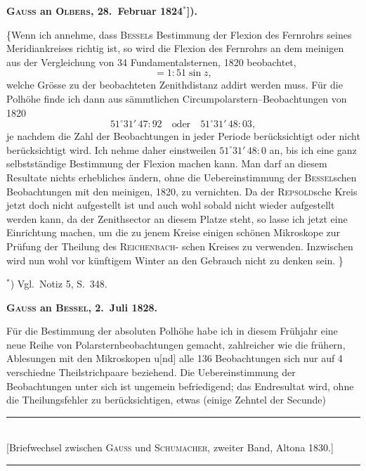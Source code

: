 \documentclass[12pt,a4paper]{article}
\theoremstyle{plain}
\theoremstyle{definition}
\theoremstyle{remark}
\begin{document}
\medskip
\begin{center}
\textbf{\textsc{Gauss} an \textsc{Olbers}, 28.\ Februar 1824$^*$]).}
\end{center}

\medskip
\{\dotfill Wenn ich annehme, dass \textsc{Bessel}s Bestimmung der Flexion des
Fernrohrs seines Meridiankreises richtig ist, so wird die Flexion des Fernrohrs
an dem meinigen aus der Vergleichung von 34 Fundamentalsternen, 1820
beobachtet,
\[= 1\!\!:\!\!51 \sin z,\]
welche Gr\"{o}sse zu der beobachteten Zenithdistanz addirt werden muss. F\"{u}r
die Polh\"{o}he finde ich dann aus s\"{a}mmtlichen Circumpolarstern--Beobachtungen
von 1820
\[51^\circ 31'\,47\!\!:\!\!92 \quad \text{oder} \quad 51^\circ 31'\,48\!\!:\!\!03,\]
je nachdem die Zahl der Beobachtungen in jeder Periode ber\"{u}cksichtigt oder
nicht ber\"{u}cksichtigt wird. Ich nehme daher einstweilen $51^\circ 31'\,48\!\!:\!\!0$ an, bis
ich eine ganz selbstst\"{a}ndige Bestimmung der Flexion machen kann. Man darf
an diesem Resultate nichts erhebliches \"{a}ndern, ohne die Uebereinstimmung
der \textsc{Bessel}schen Beobachtungen mit den meinigen, 1820, zu vernichten. Da
der \textsc{Repsold}sche Kreis jetzt doch nicht aufgestellt ist und auch wohl sobald
nicht wieder aufgestellt werden kann, da der Zenithsector an diesem Platze
steht, so lasse ich jetzt eine Einrichtung machen, um die zu jenem Kreise
einigen sch\"{o}nen Mikroskope zur Pr\"{u}fung der Theilung des \textsc{Reichenbach}-
schen Kreises zu verwenden. Inzwischen wird nun wohl vor k\"{u}nftigem Winter
an den Gebrauch nicht zu denken sein. \dotfill\}

\smallskip
$^*$) Vgl.\ Notiz 5, S.\ 348.

\medskip
\begin{center}
\textbf{\textsc{Gauss} an \textsc{Bessel}, 2.\ Juli 1828.}
\end{center}

\medskip
F\"{u}r die Bestimmung der absoluten Polh\"{o}he habe ich in diesem Fr\"{u}hjahr
eine neue Reihe von Polarsternbeobachtungen gemacht, zahlreicher wie die
fr\"{u}hern, Ablesungen mit den Mikroskopen u[nd] alle 136 Beobachtungen sich
nur auf 4 verschiedne Theilstrichpaare beziehend. Die Uebereinstimmung der
Beobachtungen unter sich ist ungemein befriedigend; das Endresultat wird, ohne
die Theilungsfehler zu ber\"{u}cksichtigen, etwas (einige Zehntel der Secunde)

\medskip
\begin{center}
\rule{0.8\textwidth}{0.4pt}\\[0.3em]
{\small [Briefwechsel zwischen \textsc{Gauss} und \textsc{Schumacher}, zweiter Band, Altona 1830.]}\\[0.3em]
\rule{0.8\textwidth}{0.4pt}
\end{center}
\end{document}
